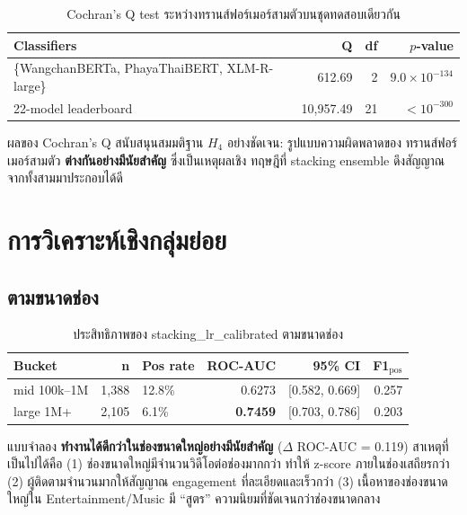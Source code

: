 \begin{table}[H]
\centering
\caption{Cochran's Q test ระหว่างทรานส์ฟอร์เมอร์สามตัวบนชุดทดสอบเดียวกัน}
\label{tab:cochranq-enc}
\begin{tabularx}{\textwidth}{Xrrr}
\toprule
\textbf{Classifiers} & \textbf{Q} & \textbf{df} & \textbf{$p$-value} \\
\midrule
\{WangchanBERTa, PhayaThaiBERT, XLM-R-large\} & 612.69 & 2 & $9.0\!\times\!10^{-134}$ \\
22-model leaderboard                          & 10{,}957.49 & 21 & $< 10^{-300}$ \\
\bottomrule
\end{tabularx}
\end{table}

ผลของ Cochran's Q สนับสนุนสมมติฐาน $H_4$ อย่างชัดเจน: รูปแบบความผิดพลาดของ
ทรานส์ฟอร์เมอร์สามตัว \textbf{ต่างกันอย่างมีนัยสำคัญ} ซึ่งเป็นเหตุผลเชิง
ทฤษฎีที่ stacking ensemble ดึงสัญญาณจากทั้งสามมาประกอบได้ดี

\section{การวิเคราะห์เชิงกลุ่มย่อย}
\label{sec:results-subpop}

\subsection{ตามขนาดช่อง}

\begin{table}[H]
\centering
\caption{ประสิทธิภาพของ stacking\_lr\_calibrated ตามขนาดช่อง}
\label{tab:by-channel-size}
\begin{tabularx}{\textwidth}{lrXrrr}
\toprule
\textbf{Bucket} & \textbf{n} & \textbf{Pos rate} & \textbf{ROC-AUC} & \textbf{95\% CI} & \textbf{F1$_{\text{pos}}$} \\
\midrule
mid 100k--1M   & 1{,}388 & 12.8\% & 0.6273 & [0.582, 0.669] & 0.257 \\
large 1M+      & 2{,}105 & 6.1\%  & \textbf{0.7459} & [0.703, 0.786] & 0.203 \\
\bottomrule
\end{tabularx}
\end{table}

แบบจำลอง \textbf{ทำงานได้ดีกว่าในช่องขนาดใหญ่อย่างมีนัยสำคัญ} ($\Delta$ ROC-AUC
= 0.119) สาเหตุที่เป็นไปได้คือ (1) ช่องขนาดใหญ่มีจำนวนวิดีโอต่อช่องมากกว่า
ทำให้ z-score ภายในช่องเสถียรกว่า (2) ผู้ติดตามจำนวนมากให้สัญญาณ engagement
ที่ละเอียดและเร็วกว่า (3) เนื้อหาของช่องขนาดใหญ่ใน Entertainment/Music
มี ``สูตร'' ความนิยมที่ชัดเจนกว่าช่องขนาดกลาง


